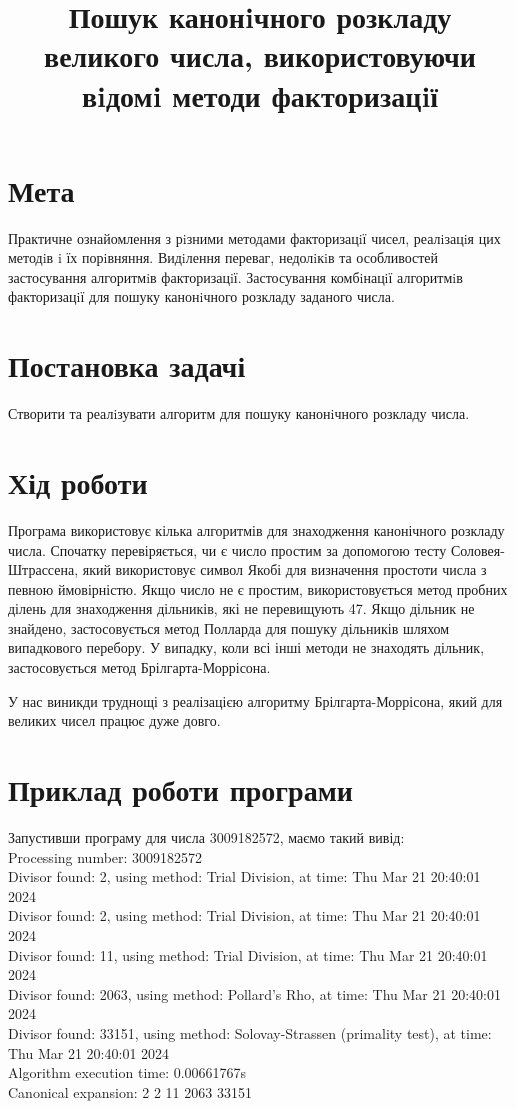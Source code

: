 \documentclass{article}
\title{Пошук канонiчного розкладу великого числа, використовуючи вiдомi методи факторизацiї}
\date{}
\begin{document}
\maketitle

\section{Мета}
\quad Практичне ознайомлення з рiзними методами факторизацiї чисел, реалiзацiя цих методiв i їх порiвняння. Видiлення переваг, недолiкiв та особливостей застосування алгоритмiв факторизацiї. Застосування комбiнацiї алгоритмiв факторизацiї для пошуку канонiчного розкладу заданого числа.

\section{Постановка задачі}
\quad Створити та реалiзувати алгоритм для пошуку канонiчного розкладу числа.

\section{Хід роботи}
\quad 
Програма використовує кілька алгоритмів для знаходження канонічного розкладу числа. Спочатку перевіряється, чи є число простим за допомогою тесту Соловея-Штрассена, який використовує символ Якобі для визначення простоти числа з певною ймовірністю. Якщо число не є простим, використовується метод пробних ділень для знаходження дільників, які не перевищують 47. Якщо дільник не знайдено, застосовується метод Полларда для пошуку дільників шляхом випадкового перебору. У випадку, коли всі інші методи не знаходять дільник, застосовується метод Брілгарта-Моррісона.

\quad 
У нас виникди труднощі з реалізацією алгоритму Брілгарта-Моррісона, який для великих чисел працює дуже довго.

\section{Приклад роботи програми}
\quad 
Запустивши програму для числа 3009182572, маємо такий вивід: \\
Processing number: 3009182572 \\
Divisor found: 2, using method: Trial Division, at time: Thu Mar 21 20:40:01 2024 \\
Divisor found: 2, using method: Trial Division, at time: Thu Mar 21 20:40:01 2024 \\
Divisor found: 11, using method: Trial Division, at time: Thu Mar 21 20:40:01 2024 \\
Divisor found: 2063, using method: Pollard's Rho, at time: Thu Mar 21 20:40:01 2024 \\
Divisor found: 33151, using method: Solovay-Strassen (primality test), at time: Thu Mar 21 20:40:01 2024 \\
Algorithm execution time: 0.00661767s \\
Canonical expansion: 2 2 11 2063 33151  \\
\end{document}
